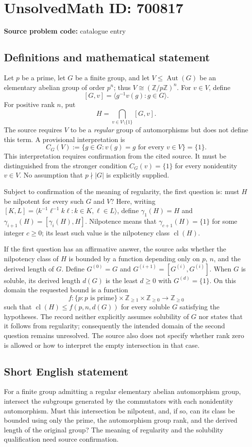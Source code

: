 \documentclass[11pt]{article}
\newcommand{\Z}{\mathbb{Z}}
\begin{document}
\section*{UnsolvedMath ID: 700817}
\textbf{Source problem code:} catalogue entry
\subsection{Definitions and mathematical statement}
Let \(p\) be a prime, let \(G\) be a finite group, and let \(V\leq\operatorname{Aut}(G)\) be an elementary abelian group of order \(p^n\); thus \(V\cong(\Z/p\Z)^n\). For \(v\in V\), define
\[
[G,v]=\langle g^{-1}v(g):g\in G\rangle.
\]
For positive rank \(n\), put
\[
H=\bigcap_{v\in V\setminus\{1\}}[G,v].
\]
The source requires \(V\) to be a \emph{regular} group of automorphisms but does not define this term. A provisional interpretation is
\[
C_G(V):=\{g\in G:v(g)=g\text{ for every }v\in V\}=\{1\}.
\]
This interpretation requires confirmation from the cited source. It must be distinguished from the stronger condition \(C_G(v)=\{1\}\) for every nonidentity \(v\in V\). No assumption that \(p\nmid |G|\) is explicitly supplied.

Subject to confirmation of the meaning of regularity, the first question is: must \(H\) be nilpotent for every such \(G\) and \(V\)? Here, writing \([K,L]=\langle k^{-1}\ell^{-1}k\ell:k\in K,\ell\in L\rangle\), define \(\gamma_1(H)=H\) and \(\gamma_{i+1}(H)=[\gamma_i(H),H]\). Nilpotence means that \(\gamma_{c+1}(H)=\{1\}\) for some integer \(c\geq0\); its least such value is the nilpotency class \(\operatorname{cl}(H)\).

If the first question has an affirmative answer, the source asks whether the nilpotency class of \(H\) is bounded by a function depending only on \(p\), \(n\), and the derived length of \(G\). Define \(G^{(0)}=G\) and \(G^{(i+1)}=[G^{(i)},G^{(i)}]\). When \(G\) is soluble, its derived length \(d(G)\) is the least \(d\geq0\) with \(G^{(d)}=\{1\}\). On this domain the requested bound is a function
\[
f:\{p:p\text{ is prime}\}\times\Z_{\geq1}\times\Z_{\geq0}\longrightarrow\Z_{\geq0}
\]
such that \(\operatorname{cl}(H)\leq f(p,n,d(G))\) for every soluble \(G\) satisfying the hypotheses. The record neither explicitly assumes solubility of \(G\) nor states that it follows from regularity; consequently the intended domain of the second question remains unresolved. The source also does not specify whether rank zero is allowed or how to interpret the empty intersection in that case.
\subsection{Short English statement}
For a finite group admitting a regular elementary abelian automorphism group, intersect the subgroups generated by the commutators with each nonidentity automorphism. Must this intersection be nilpotent, and, if so, can its class be bounded using only the prime, the automorphism group rank, and the derived length of the original group? The meaning of regularity and the solubility qualification need source confirmation.
\end{document}
